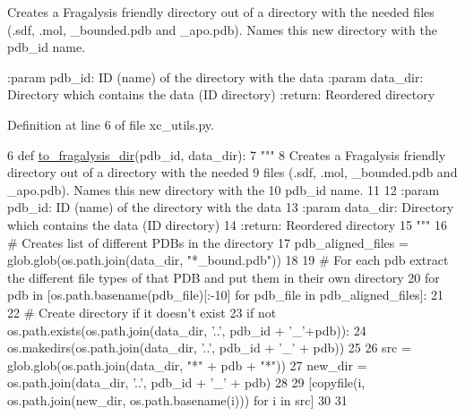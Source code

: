 \begin{DoxyVerb}Creates a Fragalysis friendly directory out of a directory with the needed
files (.sdf, .mol, _bounded.pdb and _apo.pdb). Names this new directory with the
pdb_id name.

:param pdb_id: ID (name) of the directory with the data
:param data_dir: Directory which contains the data (ID directory)
:return: Reordered directory
\end{DoxyVerb}
 

Definition at line 6 of file xc\+\_\+utils.\+py.


\begin{DoxyCode}
6 \textcolor{keyword}{def }\hyperlink{namespacefragalysis__api_1_1xcimporter_1_1xc__utils_a20b9e349b37bfbf70c38bfaf1a42876f}{to\_fragalysis\_dir}(pdb\_id, data\_dir):
7     \textcolor{stringliteral}{"""}
8 \textcolor{stringliteral}{    Creates a Fragalysis friendly directory out of a directory with the needed}
9 \textcolor{stringliteral}{    files (.sdf, .mol, \_bounded.pdb and \_apo.pdb). Names this new directory with the}
10 \textcolor{stringliteral}{    pdb\_id name.}
11 \textcolor{stringliteral}{}
12 \textcolor{stringliteral}{    :param pdb\_id: ID (name) of the directory with the data}
13 \textcolor{stringliteral}{    :param data\_dir: Directory which contains the data (ID directory)}
14 \textcolor{stringliteral}{    :return: Reordered directory}
15 \textcolor{stringliteral}{    """}
16     \textcolor{comment}{# Creates list of different PDBs in the directory}
17     pdb\_aligned\_files = glob.glob(os.path.join(data\_dir, \textcolor{stringliteral}{"*\_bound.pdb"}))
18 
19     \textcolor{comment}{# For each pdb extract the different file types of that PDB and put them in their own directory}
20     \textcolor{keywordflow}{for} pdb \textcolor{keywordflow}{in} [os.path.basename(pdb\_file)[:-10] \textcolor{keywordflow}{for} pdb\_file \textcolor{keywordflow}{in} pdb\_aligned\_files]:
21 
22         \textcolor{comment}{# Create directory if it doesn't exist}
23         \textcolor{keywordflow}{if} \textcolor{keywordflow}{not} os.path.exists(os.path.join(data\_dir, \textcolor{stringliteral}{'..'}, pdb\_id + \textcolor{stringliteral}{'\_'}+pdb)):
24             os.makedirs(os.path.join(data\_dir, \textcolor{stringliteral}{'..'}, pdb\_id + \textcolor{stringliteral}{'\_'} + pdb))
25 
26         src = glob.glob(os.path.join(data\_dir, \textcolor{stringliteral}{"*"} + pdb + \textcolor{stringliteral}{"*"}))
27         new\_dir = os.path.join(data\_dir, \textcolor{stringliteral}{'..'}, pdb\_id + \textcolor{stringliteral}{'\_'} + pdb)
28 
29         [copyfile(i, os.path.join(new\_dir, os.path.basename(i))) \textcolor{keywordflow}{for} i \textcolor{keywordflow}{in} src]
30 
31 
\end{DoxyCode}


